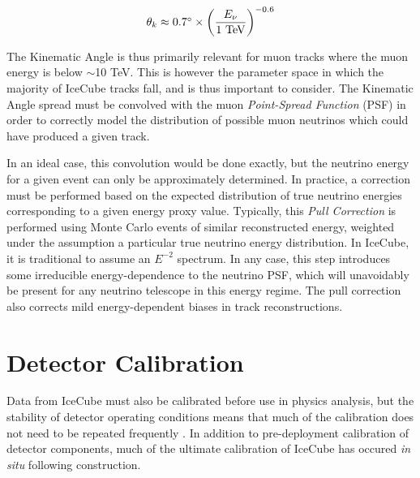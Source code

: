 \begin{equation}
	\theta_{k} \approx 0.7 \mbox{$^\circ$} \times \left( \frac{E_{\nu}}{\textup{1 TeV}} \right)^{-0.6}
\end{equation}

The Kinematic Angle is thus primarily relevant for muon tracks where the muon energy is below $\sim$10 TeV. This is however the parameter space in which the majority of IceCube tracks fall, and is thus important to consider. The Kinematic Angle spread must be convolved with the muon \emph{Point-Spread Function} (PSF) in order to correctly model the distribution of possible muon neutrinos which could have produced a given track.

In an ideal case, this convolution would be done exactly, but the neutrino energy for a given event can only be approximately determined. In practice, a correction must be performed based on the expected distribution of true neutrino energies corresponding to a given energy proxy value. Typically, this \emph{Pull Correction} is performed using Monte Carlo events of similar reconstructed energy, weighted under the assumption a particular true neutrino energy distribution. In IceCube, it is traditional to assume an $E^{-2}$ spectrum. In any case, this step introduces some irreducible energy-dependence to the neutrino PSF, which will unavoidably be present for any neutrino telescope in this energy regime. The pull correction also corrects mild energy-dependent biases in track reconstructions.

\section{Detector Calibration}
\label{sec:calibration}

Data from IceCube must also be calibrated before use in physics analysis, but the stability of detector operating conditions means that much of the calibration does not need to be repeated frequently \cite{icecube_detector_17}. In addition to pre-deployment calibration of detector components, much of the ultimate calibration of IceCube has occured \emph{in situ} following construction.

